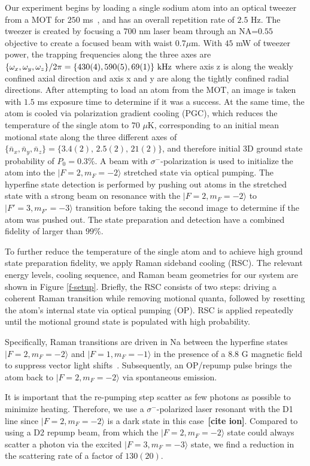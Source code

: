 \documentclass[aps,prl,twocolumn,groupedaddress]{revtex4-1}
\newcommand{\fxnote}[1]{{\textbf{[#1]}}}
\begin{document}
Our experiment begins by loading a single sodium atom into an optical tweezer from a MOT
for $250$ ms~\cite{Hutzler2017-LightShifts}, and has an overall repetition rate of $2.5$ Hz.
The tweezer is created by focusing a $700$ nm laser beam through an NA=$0.55$ objective to
create a focused beam with waist $0.7 \mu$m.
With $45$ mW of tweezer power, the trapping frequencies along the three axes are
$\{\omega_x,\omega_y,\omega_z\}/2\pi = \{430(4), 590(5), 69(1)\}\ \text{\text{kHz}}$
where axis z is along the weakly confined axial direction and axis x and y are along the
tightly confined radial directions.
After attempting to load an atom from the MOT, an image is taken with $1.5$ ms exposure time to determine if it was a success.
At the same time, the atom is cooled via polarization gradient cooling (PGC),
which reduces the temperature of the single atom to $70$ $\mu$K,
corresponding to an initial mean motional state along the three different axes of
$\{\bar n_x, \bar n_y, \bar n_z\}=\{3.4(2),\, 2.5(2),\, 21(2)\}$, and therefore initial 3D ground state probability of $P_0=0.3$\%.
A beam with $\sigma^-$-polarization is used to initialize the atom into
the $|F=2, m_F=-2\rangle$ stretched state via optical pumping.
The hyperfine state detection is performed by pushing out atoms in the stretched state with a strong
beam on resonance with the $|F=2, m_F=-2\rangle$ to $|F'=3, m_{F'}=-3\rangle$ transition before
taking the second image to determine if the atom was pushed out.
The state preparation and detection have a combined fidelity of larger than $99$\%.

To further reduce the temperature of the single atom and
to achieve high ground state preparation fidelity, we apply Raman sideband cooling (RSC).
The relevant energy levels, cooling sequence, and Raman beam geometries for our system
are shown in Figure \ref{f-setup}. Briefly, the RSC consists of two steps:
driving a coherent Raman transition while removing motional quanta, followed by resetting the atom's internal state via optical pumping (OP).
RSC is applied repeatedly until the motional ground state is populated with high probability.

Specifically, Raman transitions are driven in Na between the hyperfine states
$|F=2, m_F=-2\rangle$ and $|F=1, m_F=-1\rangle$ in the presence of a $8.8$ G magnetic field to suppress vector light shifts~\cite{Kaufman2012,Thompson2013}.
Subsequently, an OP/repump pulse brings the atom back to $|F=2, m_F=-2\rangle$
via spontaneous emission.

It is important that the re-pumping step scatter as few photons as possible to minimize heating.
Therefore, we use a $\sigma^-$-polarized laser resonant with the D1 line
since $|F=2, m_F=-2\rangle$ is a dark state in this case~\cite{Grobner2017}\fxnote{cite ion}.
Compared to using a D2 repump beam, from which the $|F=2, m_F=-2\rangle$ state
could always scatter a photon via the excited $|F=3, m_F=-3\rangle$ state,
we find a reduction in the scattering rate of a factor of $130(20)$.
\end{document}
